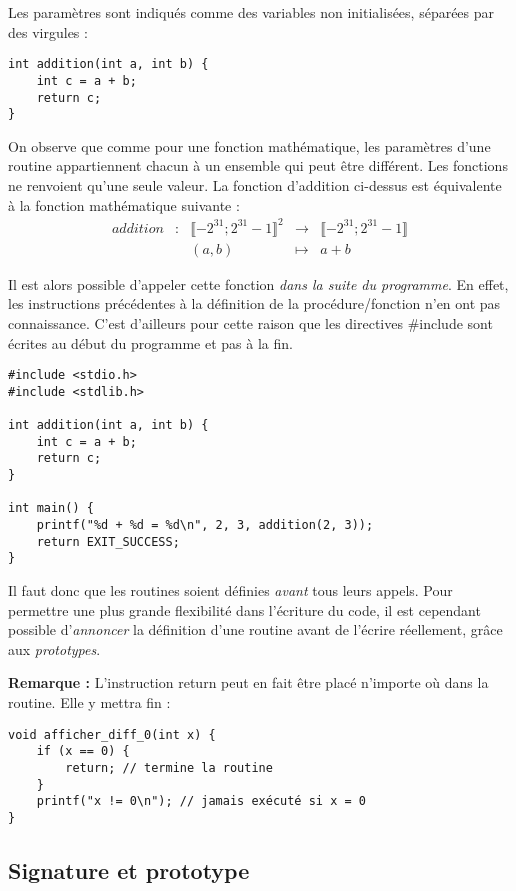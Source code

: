 \documentclass[../../../main.tex]{subfiles}
\begin{document}
Les paramètres sont indiqués comme des variables non initialisées, séparées par des virgules :
\begin{verbatim}
int addition(int a, int b) {
	int c = a + b;
	return c;
}
\end{verbatim}
On observe que comme pour une fonction mathématique, les paramètres d'une routine appartiennent chacun à un ensemble qui peut être différent. Les fonctions ne renvoient qu'une seule valeur. La fonction d'addition ci-dessus est équivalente à la fonction mathématique suivante :
$$
\begin{array}{ccccl}
addition & : & \llbracket{-2^{31}}; 2^{31}-1\rrbracket^{2} & \rightarrow & \llbracket{-2^{31}}; 2^{31}-1\rrbracket \\
 & & (a, b) & \mapsto & a + b
\end{array}
$$

Il est alors possible d'appeler cette fonction \textit{dans la suite du programme}. En effet, les instructions précédentes à la définition de la procédure/fonction n'en ont pas connaissance. C'est d'ailleurs pour cette raison que les directives \textsf{\#include} sont écrites au début du programme et pas à la fin.
\begin{verbatim}
#include <stdio.h>
#include <stdlib.h>

int addition(int a, int b) {
	int c = a + b;
	return c;
}

int main() {
	printf("%d + %d = %d\n", 2, 3, addition(2, 3));
	return EXIT_SUCCESS;
}
\end{verbatim}
Il faut donc que les routines soient définies \textit{avant} tous leurs appels. Pour permettre une plus grande flexibilité dans l'écriture du code, il est cependant possible d'\textit{annoncer} la définition d'une routine avant de l'écrire réellement, grâce aux \textit{prototypes}.
 
\textbf{Remarque :} L'instruction \textsf{return} peut en fait être placé n'importe où dans la routine. Elle y mettra fin :
\begin{verbatim}
void afficher_diff_0(int x) {
	if (x == 0) {
		return; // termine la routine
	}
	printf("x != 0\n"); // jamais exécuté si x = 0
}
\end{verbatim}
\subsection{Signature et prototype}
\end{document}
